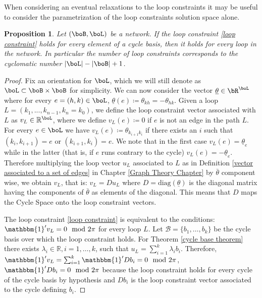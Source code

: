 \documentclass[11pt,a4paper,oneside,openany]{book}
\newtheorem{prop}[theorem]{Proposition}
\numberwithin{definition}{section}
\numberwithin{theorem}{section}
\numberwithin{problem}{section}
\begin{document}
When considering an eventual relaxations to the loop constraints it may be useful to consider the parametrization of the loop constraints solution space alone.
\begin{prop}
Let $(\boB,\boL)$ be a network. If the loop constraint \ref{loop constraint} holds for every element of a cycle basis, then it holds for every loop in the network. In particular the number of loop constraints corresponds to the cyclomatic number $|\boL| - |\boB| + 1$.
\end{prop}
\begin{proof}
Fix an orientation for $\boL$, which we will still denote as $\boL \subset \boB \times \boB$ for simplicity. We can now consider the vector $\underline \theta \in \bR^{\boL}$ where for every $e = (h,k) \in \boL$, $\underline \theta(e) \coloneqq \theta_{kh} = - \theta_{hk} $. Given a loop $L = (k_1,...,k_{n-1},k_n = k_0)$, we define the loop constraint vector associated with $L$ as $v_L \in \mathbb{R}^{\boL}$, where  we define $v_L(e) \coloneqq 0$  if $e$ is not an edge in the path $L$. For every $e \in \boL$ we have $v_L(e) \coloneqq \theta_{k_{i+1}k_i}$  if there exists an $i$ such that $(k_i,k_{i+1}) = e$ or $ (k_{i+1},k_{i}) = e$. We note that in the first case $v_L(e) = \underline \theta_e$ while in the latter (that is, if $e$ runs contrary to the cycle)  $v_L(e) = - \underline \theta_e$. Therefore multiplying the loop vector \(u_L\) associated to $L$ as in Definition \ref{vector associated to a set of edges} in Chapter \ref{Graph Theory Chapter} by $\bar \theta$ component wise, we obtain $v_L$, that is: \(v_L = Du_L\) where $D= \text{diag}(\underline \theta )$ is the diagonal matrix having  the components of $ \bar \theta$ as elements of the diagonal. This means that $D$ maps the Cycle Space onto the loop constraint vectors. 

The loop constraint \eqref{loop constraint} is equivalent to the conditions: $\mathbbm{1}'v_L=0 \mod 2\pi$ for every loop $L$. Let $\mathcal{B} = \{b_1,\ldots,b_k\}$ be the cycle basis over which the loop constraint holds. For Theorem \ref{cycle base theorem} there exists $\lambda_i \in \mathbb{R}, i=1,\ldots,k$, such that $u_L = \sum_{i=1}^k \lambda_ib_i$. Therefore, $\mathbbm{1}'v_L = \sum_{i=1}^k \mathbbm{1}'Db_i = 0  \mod 2\pi$, $\mathbbm{1}'Db_i = 0  \mod 2\pi$ because the loop constraint holds for every cycle of the cycle basis by hypothesis and $Db_i$ is the loop constraint vector associated to the cycle defining $b_i$.
\end{proof}
\end{document}
